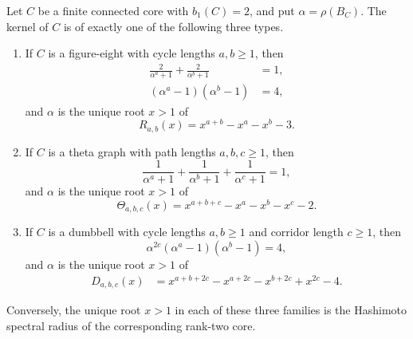 \documentclass[10pt,a4paper]{amsart}
\begin{document}
\begin{theorem}
\label{thm:rank-two-polynomials}
Let \(C\) be a finite connected core with \(b_1(C)=2\), and put
\(\alpha=\rho(B_C)\).  The kernel of \(C\) is of exactly one of the following
three types.
\begin{enumerate}[label=\textup{(\roman*)}]
  \item If \(C\) is a figure-eight with cycle lengths \(a,b\geq1\), then
  \begin{align}
    \frac{2}{\alpha^a+1}+\frac{2}{\alpha^b+1}&=1,
      \label{eq:figure-eight-pressure}\\
    (\alpha^a-1)(\alpha^b-1)&=4,                \label{eq:figure-eight-product}
  \end{align}
  and \(\alpha\) is the unique root \(x>1\) of
  \begin{equation}\label{eq:figure-eight-polynomial}
    R_{a,b}(x)=x^{a+b}-x^a-x^b-3.
  \end{equation}

  \item If \(C\) is a theta graph with path lengths \(a,b,c\geq1\), then
  \begin{equation}\label{eq:theta-pressure}
    \frac{1}{\alpha^a+1}
    +\frac{1}{\alpha^b+1}
    +\frac{1}{\alpha^c+1}=1,
  \end{equation}
  and \(\alpha\) is the unique root \(x>1\) of
  \begin{equation}\label{eq:theta-polynomial}
    \Theta_{a,b,c}(x)
    =x^{a+b+c}-x^a-x^b-x^c-2.
  \end{equation}

  \item If \(C\) is a dumbbell with cycle lengths \(a,b\geq1\) and corridor
  length \(c\geq1\), then
  \begin{equation}\label{eq:dumbbell-pressure}
    \alpha^{2c}(\alpha^a-1)(\alpha^b-1)=4,
  \end{equation}
  and \(\alpha\) is the unique root \(x>1\) of
  \begin{align}
    D_{a,b,c}(x)
    &=
    x^{a+b+2c}-x^{a+2c}-x^{b+2c}+x^{2c}-4.
    \label{eq:dumbbell-polynomial}
  \end{align}
\end{enumerate}
Conversely, the unique root \(x>1\) in each of these three families is the
Hashimoto spectral radius of the corresponding rank-two core.
\end{theorem}
\end{document}
